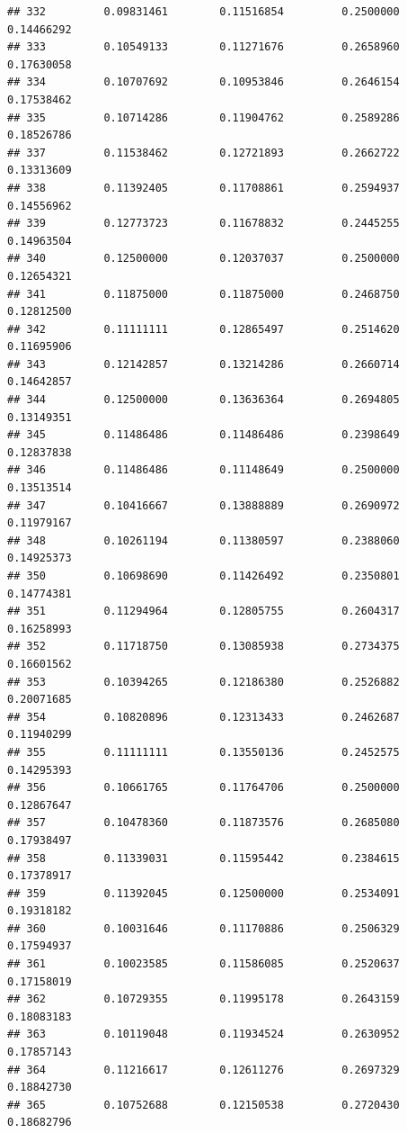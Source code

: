 \documentclass[]{article}
\begin{document}
\begin{verbatim}
## 332         0.09831461        0.11516854         0.2500000          0.14466292
## 333         0.10549133        0.11271676         0.2658960          0.17630058
## 334         0.10707692        0.10953846         0.2646154          0.17538462
## 335         0.10714286        0.11904762         0.2589286          0.18526786
## 337         0.11538462        0.12721893         0.2662722          0.13313609
## 338         0.11392405        0.11708861         0.2594937          0.14556962
## 339         0.12773723        0.11678832         0.2445255          0.14963504
## 340         0.12500000        0.12037037         0.2500000          0.12654321
## 341         0.11875000        0.11875000         0.2468750          0.12812500
## 342         0.11111111        0.12865497         0.2514620          0.11695906
## 343         0.12142857        0.13214286         0.2660714          0.14642857
## 344         0.12500000        0.13636364         0.2694805          0.13149351
## 345         0.11486486        0.11486486         0.2398649          0.12837838
## 346         0.11486486        0.11148649         0.2500000          0.13513514
## 347         0.10416667        0.13888889         0.2690972          0.11979167
## 348         0.10261194        0.11380597         0.2388060          0.14925373
## 350         0.10698690        0.11426492         0.2350801          0.14774381
## 351         0.11294964        0.12805755         0.2604317          0.16258993
## 352         0.11718750        0.13085938         0.2734375          0.16601562
## 353         0.10394265        0.12186380         0.2526882          0.20071685
## 354         0.10820896        0.12313433         0.2462687          0.11940299
## 355         0.11111111        0.13550136         0.2452575          0.14295393
## 356         0.10661765        0.11764706         0.2500000          0.12867647
## 357         0.10478360        0.11873576         0.2685080          0.17938497
## 358         0.11339031        0.11595442         0.2384615          0.17378917
## 359         0.11392045        0.12500000         0.2534091          0.19318182
## 360         0.10031646        0.11170886         0.2506329          0.17594937
## 361         0.10023585        0.11586085         0.2520637          0.17158019
## 362         0.10729355        0.11995178         0.2643159          0.18083183
## 363         0.10119048        0.11934524         0.2630952          0.17857143
## 364         0.11216617        0.12611276         0.2697329          0.18842730
## 365         0.10752688        0.12150538         0.2720430          0.18682796

\end{verbatim}
\end{document}
